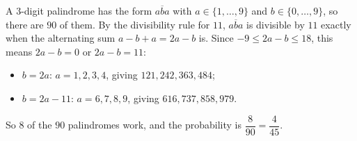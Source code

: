 A $3$-digit palindrome has the form $\overline{aba}$ with $a\in\{1,\dots,9\}$ and $b\in\{0,\dots,9\}$, so there are $90$ of them. By the divisibility rule for $11$, $\overline{aba}$ is divisible by $11$ exactly when the alternating sum $a-b+a=2a-b$ is. Since $-9\le2a-b\le18$, this means $2a-b=0$ or $2a-b=11$:
\begin{itemize}
\item $b=2a$: $a=1,2,3,4$, giving $121,242,363,484$;
\item $b=2a-11$: $a=6,7,8,9$, giving $616,737,858,979$.
\end{itemize}
So $8$ of the $90$ palindromes work, and the probability is $\dfrac{8}{90}=\boxed{\dfrac{4}{45}}$.
